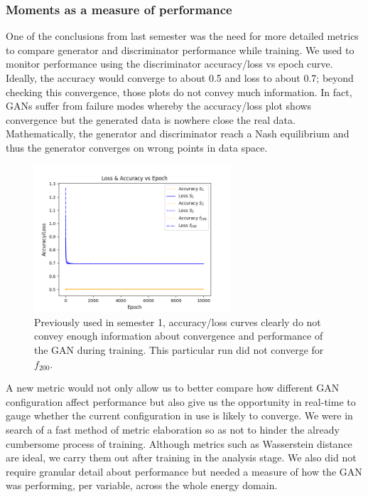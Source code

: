 \documentclass[11pt]{article} %
\begin{document}
\subsubsection{Moments as a measure of performance}
One of the conclusions from last semester was the need for more detailed metrics to compare generator and discriminator
performance while training.
We used to monitor performance using the discriminator accuracy/loss vs epoch curve.
Ideally, the accuracy would converge to about 0.5 and loss to about 0.7; beyond checking this convergence, those plots do not convey much information.
In fact, GANs suffer from failure modes whereby the accuracy/loss plot shows convergence but
the generated data is nowhere close the real data.
Mathematically, the generator and discriminator reach a Nash equilibrium \cite{salimans2016improved}
and thus the generator converges on wrong points in data space.
\begin{figure}[H]
\centering
\includegraphics[width=0.65\textwidth]{./images/performance.png}
\caption{Previously used in semester 1, accuracy/loss curves clearly do not convey enough
information about convergence and performance of the GAN during training.
This particular run did not converge for $f_{200}$.}
\label{fig:acc_loss}
\end{figure}
\par
A new metric would not only allow us to better compare how different GAN configuration affect performance but also
give us the opportunity in real-time to gauge whether the current configuration in use is likely to converge.
We were in search of a fast method of metric elaboration so as not to hinder the already cumbersome process of training.
Although metrics such as Wasserstein distance are ideal, we carry them out after training in the analysis stage.
We also did not require granular detail about performance but needed a measure of how the GAN was performing, per variable, across the whole energy domain.
\end{document}
